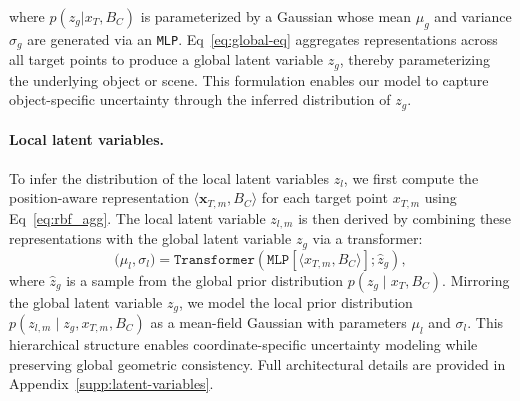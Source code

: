 where \( p(z_g | x_T, B_C) \) is parameterized by a Gaussian whose mean \( \mu_g \) and variance \( \sigma_g \) are generated via an \texttt{MLP}. Eq~\eqref{eq:global-eq} aggregates representations across all target points to produce a global latent variable \( z_g \), thereby parameterizing the underlying object or scene. This formulation enables our model to capture object-specific uncertainty through the inferred distribution of \( z_g \).



\paragraph{Local latent variables.}
To infer the distribution of the local latent variables \( {z}_l \), we first compute the position-aware representation \( \langle \mathbf{x}_{T,m}, {B}_C \rangle \) for each target point \( {x}_{T,m} \) using Eq~\eqref{eq:rbf_agg}. 
The local latent variable \( {z}_{l,m} \) is then derived by combining these representations with the global latent variable \( {z}_g \) via a transformer:
\[
    \big( \mu_{l}, \sigma_{l} \big)  
    = \texttt{Transformer}\left( \texttt{MLP}\left[ \langle {x}_{T,m}, {B}_C \rangle \right]; \hat{{z}}_g \right),
\]
where \( \hat{{z}}_g \) is a sample from the global prior distribution \( p({z}_g \mid {x}_T, {B}_C) \). 
Mirroring the global latent variable \( {z}_g \), we model the local prior distribution \( p({z}_{l,m} \mid {z}_g, {x}_{T,m}, {B}_C) \) as a mean-field Gaussian with parameters \( \mu_{l} \) and \( \sigma_{l} \). This hierarchical structure enables coordinate-specific uncertainty modeling while preserving global geometric consistency. Full architectural details are provided in Appendix~\ref{supp:latent-variables}.

